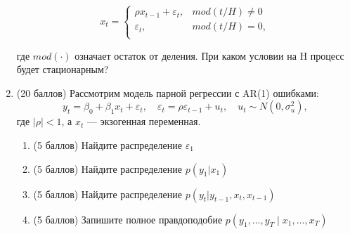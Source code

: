 \documentclass[12pt]{article}
\begin{document}
\begin{enumerate}
\[
x_t =
\begin{cases}
	 \rho x_{t-1} + \varepsilon_t, &mod( t / H) \neq 0\\
	\varepsilon_t,  &mod( t / H)  = 0,\\
\end{cases}
\]

где $mod(\cdot)$ означает остаток от деления. При каком условии на H процесс будет стационарным? 




\item (20 баллов) Рассмотрим модель парной регрессии с AR(1) ошибками:
\begin{equation*}
	y_t = \beta_0 + \beta_1 x_t + \varepsilon_t, \quad \varepsilon_t = \rho \varepsilon_{t-1} + u_t, \quad u_t \sim N(0, \sigma^2_u),
\end{equation*}
где $|\rho| < 1$, а $x_t$ — экзогенная переменная.

\begin{enumerate}
	\item (5 баллов) Найдите распределение $\varepsilon_1$
	\item (5 баллов) Найдите распределение $p(y_1 | x_1)$
	\item (5 баллов) Найдите распределение $p(y_t | y_{t-1}, x_t, x_{t-1	})$
	\item (5 баллов) Запишите полное правдоподобие $p(y_1, \ldots, y_T \mid x_1, \ldots, x_T) $
\end{enumerate}

\end{enumerate}
\end{document}
